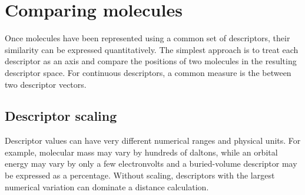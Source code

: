 
\section{Comparing molecules}

Once molecules have been represented using a common set of descriptors, their similarity can be expressed quantitatively.
The simplest approach is to treat each descriptor as an axis and compare the positions of two molecules in the resulting descriptor space. For continuous descriptors, a common measure is the  between two descriptor vectors.


\subsection{Descriptor scaling}

Descriptor values can have very different numerical ranges and physical units.
For example, molecular mass may vary by hundreds of daltons, while an orbital energy may vary by only a few electronvolts and a buried-volume descriptor may be expressed as a percentage.
Without scaling, descriptors with the largest numerical variation can dominate a distance calculation.

